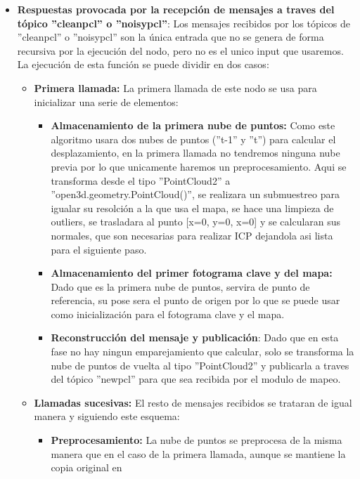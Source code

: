 \documentclass[12pt, a4paper, twoside]{article}
\begin{document}
\begin{itemize}
\begin{itemize}
  \end{itemize}
  \item \textbf{Respuestas provocada por la recepción de mensajes a traves del tópico ''clean\textunderscore pcl'' o ''noisy\textunderscore pcl''}:
  Los mensajes recibidos por los tópicos de ''clean\textunderscore pcl'' o ''noisy\textunderscore pcl'' son la única entrada que no se genera de forma recursiva por 
  la ejecución del nodo, pero no es el unico input que usaremos. La ejecución de esta función se puede dividir en dos casos:
  \begin{itemize}
    \item \textbf{Primera llamada:} La primera llamada de este nodo se usa para inicializar una serie de elementos:
    \begin{itemize}
      \item \textbf{Almacenamiento de la primera nube de puntos:} Como este algoritmo usara dos nubes de puntos (''t-1'' y ''t'') para calcular el desplazamiento, en 
      la primera llamada no tendremos ninguna nube previa por lo que unicamente haremos un preprocesamiento. \newline Aqui se transforma desde el tipo ''PointCloud2'' a 
      ''open3d.geometry.PointCloud()'', se realizara un submuestreo para igualar su resolción a la que usa el mapa, se hace una limpieza de outliers, se trasladara al 
      punto [x=0, y=0, x=0] y se calcularan sus normales, que son necesarias para realizar ICP dejandola asi lista para el siguiente paso.
      \item \textbf{Almacenamiento del primer fotograma clave y del mapa:} Dado que es la primera nube de puntos, servira de punto de referencia, su pose 
      sera el punto de origen por lo que se puede usar como inicialización para el fotograma clave y el mapa.
      \item \textbf{Reconstrucción del mensaje y publicación}: Dado que en esta fase no hay ningun emparejamiento que calcular, solo se transforma la nube de puntos 
      de vuelta al tipo ''PointCloud2'' y publicarla a traves del tópico ''new\textunderscore pcl'' para que sea recibida por el modulo de mapeo.
    \end{itemize}
    \item \textbf{Llamadas sucesivas:} El resto de mensajes recibidos se trataran de igual manera y siguiendo este esquema:
    \begin{itemize}
      \item \textbf{Preprocesamiento:} La nube de puntos se preprocesa de la misma manera que en el caso de la primera llamada, aunque se mantiene la copia original en 

\end{itemize}
\end{itemize}
\end{itemize}
\end{document}
